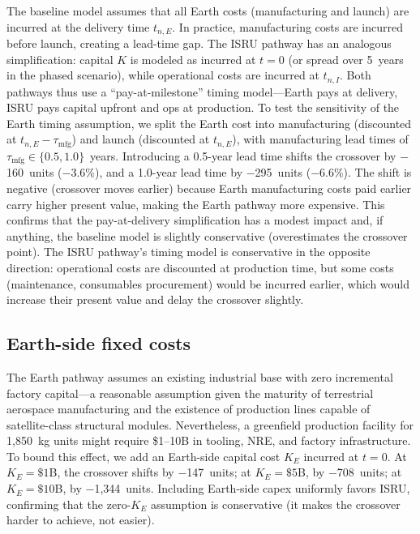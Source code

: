 \documentclass[preprint,12pt]{elsarticle}
\begin{document}
The baseline model assumes that all Earth costs (manufacturing and launch) are incurred at the delivery time $t_{n,E}$. In practice, manufacturing costs are incurred before launch, creating a lead-time gap. The ISRU pathway has an analogous simplification: capital $K$ is modeled as incurred at $t = 0$ (or spread over 5~years in the phased scenario), while operational costs are incurred at $t_{n,I}$. Both pathways thus use a ``pay-at-milestone'' timing model---Earth pays at delivery, ISRU pays capital upfront and ops at production. To test the sensitivity of the Earth timing assumption, we split the Earth cost into manufacturing (discounted at $t_{n,E} - \tau_{\mathrm{mfg}}$) and launch (discounted at $t_{n,E}$), with manufacturing lead times of $\tau_{\mathrm{mfg}} \in \{0.5, 1.0\}$~years. Introducing a 0.5-year lead time shifts the crossover by $-$160~units ($-$3.6\%), and a 1.0-year lead time by $-$295~units ($-$6.6\%). The shift is negative (crossover moves earlier) because Earth manufacturing costs paid earlier carry higher present value, making the Earth pathway more expensive. This confirms that the pay-at-delivery simplification has a modest impact and, if anything, the baseline model is slightly conservative (overestimates the crossover point). The ISRU pathway's timing model is conservative in the opposite direction: operational costs are discounted at production time, but some costs (maintenance, consumables procurement) would be incurred earlier, which would increase their present value and delay the crossover slightly.

\subsection{Earth-side fixed costs}
\label{sec:earth_capex}

The Earth pathway assumes an existing industrial base with zero incremental factory capital---a reasonable assumption given the maturity of terrestrial aerospace manufacturing and the existence of production lines capable of satellite-class structural modules. Nevertheless, a greenfield production facility for 1{,}850~kg units might require \$1--10B in tooling, NRE, and factory infrastructure. To bound this effect, we add an Earth-side capital cost $K_E$ incurred at $t = 0$. At $K_E = \$1$B, the crossover shifts by $-$147~units; at $K_E = \$5$B, by $-$708~units; at $K_E = \$10$B, by $-$1{,}344~units. Including Earth-side capex uniformly favors ISRU, confirming that the zero-$K_E$ assumption is conservative (it makes the crossover harder to achieve, not easier).
\end{document}
